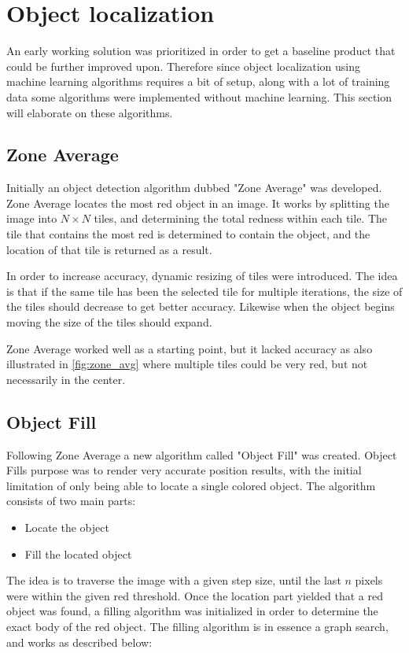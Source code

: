 \section{Object localization}\label{Design:ObjectLocalization}
An early working solution was prioritized in order to get a baseline product that could be further improved upon.
Therefore since object localization using machine learning algorithms requires a bit of setup, along with a lot of training data some algorithms were implemented without machine learning.
This section will elaborate on these algorithms.

\subsection{Zone Average}
Initially an object detection algorithm dubbed "Zone Average" was developed.
Zone Average locates the most red object in an image.
It works by splitting the image into $N\times N$ tiles, and determining the total redness within each tile.
The tile that contains the most red is determined to contain the object, and the location of that tile is returned as a result.

In order to increase accuracy, dynamic resizing of tiles were introduced.
The idea is that if the same tile has been the selected tile for multiple iterations, the size of the tiles should decrease to get better accuracy.
Likewise when the object begins moving the size of the tiles should expand.


Zone Average worked well as a starting point, but it lacked accuracy as also illustrated in \autoref{fig:zone_avg} where multiple tiles could be very red, but not necessarily in the center.

\subsection{Object Fill}
\label{sec:objectfilldesign}
Following Zone Average a new algorithm called "Object Fill" was created.
Object Fills purpose was to render very accurate position results, with the initial limitation of only being able to locate a single colored object.
The algorithm consists of two main parts:
\begin{itemize}
	\item Locate the object
	\item Fill the located object
\end{itemize}
The idea is to traverse the image with a given step size, until the last $n$ pixels were within the given red threshold.
Once the location part yielded that a red object was found, a filling algorithm was initialized in order to determine the exact body of the red object.
The filling algorithm is in essence a graph search, and works as described below:

